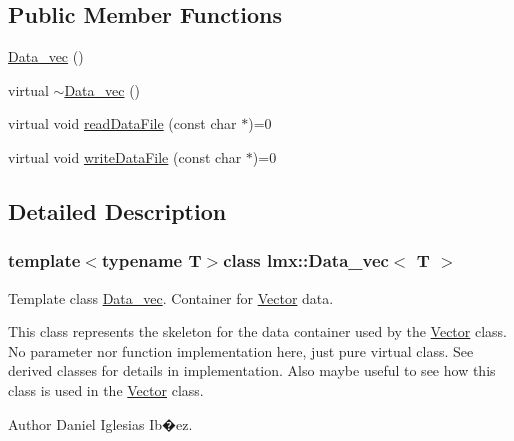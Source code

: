\subsection*{Public Member Functions}
\begin{DoxyCompactItemize}
\item 
\hyperlink{classlmx_1_1Data__vec_a4df811d60407578d5c83a43030e604f1}{Data\-\_\-vec} ()
\item 
virtual \hyperlink{classlmx_1_1Data__vec_a956beb5c5795e66ef418d7fabab3f578}{$\sim$\-Data\-\_\-vec} ()
\item 
virtual void \hyperlink{classlmx_1_1Data__vec_a32d6a9d26eb14ceec99e0ee0b6b33f47}{read\-Data\-File} (const char $\ast$)=0
\item 
virtual void \hyperlink{classlmx_1_1Data__vec_a2df91dd20f0a882dffe0872110dfeb7f}{write\-Data\-File} (const char $\ast$)=0
\end{DoxyCompactItemize}


\subsection{Detailed Description}
\subsubsection*{template$<$typename T$>$class lmx\-::\-Data\-\_\-vec$<$ T $>$}

Template class \hyperlink{classlmx_1_1Data__vec}{Data\-\_\-vec}. Container for \hyperlink{classlmx_1_1Vector}{Vector} data. 

This class represents the skeleton for the data container used by the \hyperlink{classlmx_1_1Vector}{Vector} class. No parameter nor function implementation here, just pure virtual class. See derived classes for details in implementation. Also maybe useful to see how this class is used in the \hyperlink{classlmx_1_1Vector}{Vector} class.

\begin{DoxyAuthor}{Author}
Daniel Iglesias Ib�ez. 
\end{DoxyAuthor}


